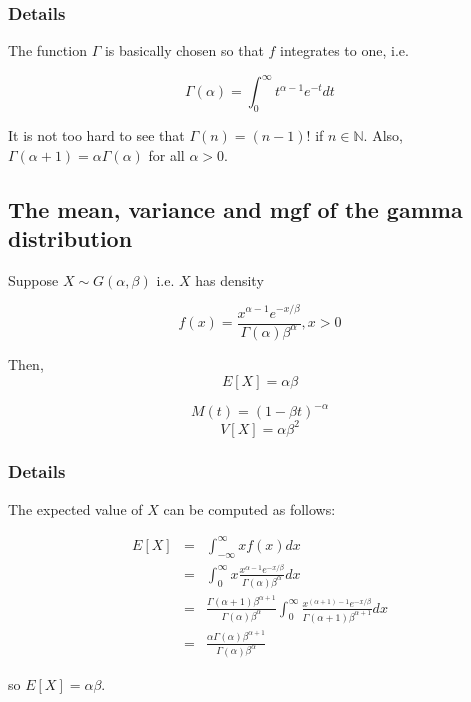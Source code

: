 \documentclass[12pt,a4paper]{article}
\theoremstyle{regla}
\theoremstyle{remark}
\theoremstyle{definition}
\theoremstyle{nonumberbreak}
\begin{document}
\subsubsection{Details}
The function $\Gamma$ is basically chosen so that $f$ integrates to one, i.e.


$$\Gamma(\alpha) = \int_0^\infty t^{\alpha-1} e^{-t}dt$$

It is not too hard to see that $\Gamma(n)=(n-1)!$ if $n \in \mathbb{N}$. Also, $\Gamma(\alpha + 1) = \alpha \Gamma(\alpha)$ for all $\alpha >0$.


\subsection{The mean, variance and mgf of the gamma distribution}
\begin{fbox}
\begin{minipage}{0.97\textwidth}
Suppose $X \sim G (\alpha, \beta)$ i.e. $X$ has density

$$ f(x) = \frac{x^{\alpha -1} e^{-x/\beta}} {\Gamma (\alpha) \beta^{\alpha}} , x > 0  $$

Then,
$$E[X] = \alpha\beta$$

$$M(t) = (1-\beta t)^{-\alpha}$$ $$

V[X] = \alpha \beta^2  $$

\end{minipage}
\end{fbox}
\subsubsection{Details}
The expected value of $X$ can be computed as follows:

\begin{eqnarray*}
E[X] & = & \int_{-\infty}^{\infty} xf(x)dx \\
 & = & \int_{0}^{\infty} x \frac{x^{\alpha -1} e^{-x/\beta}} {\Gamma (\alpha) \beta^{\alpha}} dx \\
 & = & \frac{\Gamma(\alpha+1)\beta^{\alpha+1}}{\Gamma(\alpha)\beta^{\alpha}} \int_{0}^{\infty}  \frac{x^{(\alpha+1) -1} e^{-x/\beta}} {\Gamma (\alpha+1) \beta^{\alpha+1}} dx\\
 & = & \frac{\alpha\Gamma(\alpha)\beta^{\alpha+1}}{\Gamma(\alpha)\beta^{\alpha}} 
\end{eqnarray*} 

so $E[X] = \alpha\beta$. \\
\end{document}
